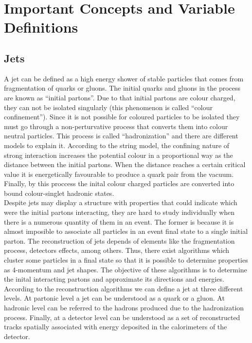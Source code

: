  \chapter{Important Concepts and Variable Definitions}\label{Important_concepts_chapter}
 
 \section{Jets}
 A jet can be defined as a high energy shower of stable particles that comes from fragmentation of quarks or gluons. The initial quarks and gluons in the process are known as ``initial partons''.
 Due to that initial partons are colour charged, they can not be isolated singularly (this phenomenon is called ``colour confinement''). Since it is not possible for coloured particles to be isolated 
 they must go through a non-perturvative process that converts them into colour neutral particles. This process is called ``hadronization'' and there are different models to explain it. According to 
 the string model, the confining nature of strong interaction increases the potential colour in a proportional way as the distance between the initial partons. When the distance reaches a certain 
 critical value it is energetically favourable to produce a quark pair from the vacuum. Finally, by this proccess the inital colour charged particles are converted into bound colour-singlet hadronic 
 states. \\
 
 Despite jets may display a structure with properties that could indicate which were the initial partons interacting, they are hard to study individually when there is a numerous quantity of them
 in an event. The former is because it is almost imposible to associate all particles in an event final state to a single initial parton. The reconstruction of jets depends of elements like the 
 fragmentation process, detectors effects, among others. Thus, there exist algorithms which cluster some particles in a final state so that it is possible to determine properties as 4-momentum 
 and jet shapes. The objective of these algorithms is to determine the inital interacting partons and approximate its directions and energies. \\
 
 According to the reconstruction algorithms we can define a jet at three different levels. At partonic level a jet can be understood as a quark or a gluon. At hadronic level can be referred to the
 hadrons produced due to the hadronization process. Finally, at a detector level can be understood as a set of reconstructed tracks spatially associated with energy deposited in the calorimeters of the detector.
 
